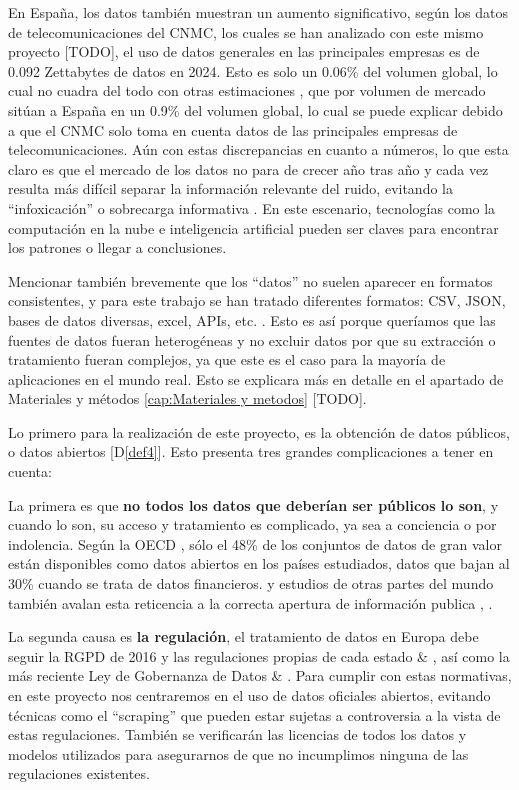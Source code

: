 En España, los datos también muestran un aumento significativo, según los datos de telecomunicaciones del CNMC, los cuales se han analizado con este mismo proyecto \citep{DatosGeneralesCNMC} [TODO], el uso de datos generales en las principales empresas es de 0.092 Zettabytes de datos en 2024.
Esto es solo un 0.06\% del volumen global, lo cual no cuadra del todo con otras estimaciones \citep{DatosMercadosEspanna}, que por volumen de mercado sitúan a España en un 0.9\% del volumen global, lo cual se puede explicar debido a que el CNMC solo toma en cuenta datos de las principales empresas de telecomunicaciones. 
Aún con estas discrepancias en cuanto a números, lo que esta claro es que el mercado de los datos no para de crecer año tras año y cada vez resulta más difícil separar la información relevante del ruido, evitando la ``infoxicación'' o sobrecarga informativa \citep{Infoxicacion}. En este escenario, tecnologías como la computación en la nube e inteligencia artificial pueden ser claves para encontrar los patrones o llegar a conclusiones.

Mencionar también brevemente que los ``datos'' no suelen aparecer en formatos consistentes, y para este trabajo se han tratado diferentes formatos: CSV, JSON, bases de datos diversas, excel, APIs, etc. \citep{khan2019fileFormats}. Esto es así porque queríamos que las fuentes de datos fueran heterogéneas y no excluir datos por que su extracción o tratamiento fueran complejos, ya que este es el caso para la mayoría de aplicaciones en el mundo real. Esto se explicara más en detalle en el apartado de Materiales y métodos \ref{cap:Materiales y metodos} [TODO].

Lo primero para la realización de este proyecto, es la obtención de datos públicos, o datos abiertos [D\ref{def4}]. Esto presenta tres grandes complicaciones a tener en cuenta:

La primera es que \textbf{no todos los datos que deberían ser públicos lo son}, y cuando lo son, su acceso y tratamiento es complicado, ya sea a conciencia o por indolencia. Según la OECD \citep{OECD2023openData}, sólo el 48\% de los conjuntos de datos de gran valor están disponibles como datos abiertos en los países estudiados, datos que bajan al 30\% cuando se trata de datos financieros. y estudios de otras partes del mundo también avalan esta reticencia a la correcta apertura de información publica \citep{TransparenciaEcuador}, \citep{TransparenciaMexico}.

La segunda causa es \textbf{la regulación}, el tratamiento de datos en Europa debe seguir la RGPD de 2016 y las regulaciones propias de cada estado \citep{LicenciasLibres2017Datos} \& \citep{webRGPD2016Europa}, así como la más reciente Ley de Gobernanza de Datos \citep{webLGD2023Europa} \& \citep{DatosAbiertos2022Cloud}. Para cumplir con estas normativas, en este proyecto nos centraremos en el uso de datos oficiales abiertos, evitando técnicas como el ``scraping'' que pueden estar sujetas a controversia a la vista de estas regulaciones. También se verificarán las licencias de todos los datos y modelos utilizados para asegurarnos de que no incumplimos ninguna de las regulaciones existentes.

